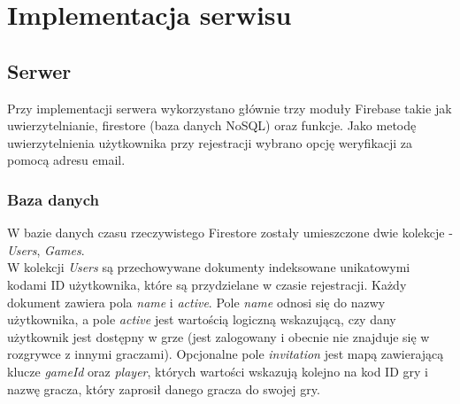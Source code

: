 \chapter{Implementacja serwisu}
\thispagestyle{chapterBeginStyle}

\section{Serwer}

Przy implementacji serwera wykorzystano głównie trzy moduły Firebase takie jak uwierzytelnianie, firestore (baza danych NoSQL) oraz funkcje. Jako metodę uwierzytelnienia użytkownika przy rejestracji wybrano opcję weryfikacji za pomocą adresu email.

\subsection{Baza danych}

W bazie danych czasu rzeczywistego Firestore zostały umieszczone dwie kolekcje - \emph{Users}, \emph{Games}. \\

W kolekcji \emph{Users} są przechowywane dokumenty indeksowane unikatowymi kodami ID użytkownika, które są przydzielane w czasie rejestracji. Każdy dokument zawiera pola \emph{name} i \emph{active}. Pole \emph{name} odnosi się do nazwy użytkownika, a pole \emph{active} jest wartością logiczną wskazującą, czy dany użytkownik jest dostępny w grze (jest zalogowany i obecnie nie znajduje się w rozgrywce z innymi graczami). Opcjonalne pole \emph{invitation} jest mapą zawierającą klucze \emph{gameId} oraz \emph{player}, których wartości wskazują kolejno na kod ID gry i nazwę gracza, który zaprosił danego gracza do swojej gry. \\

